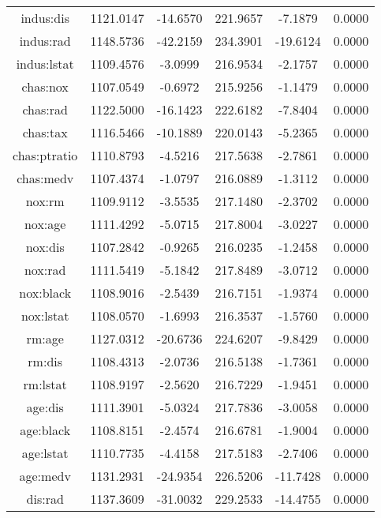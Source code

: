 \begin{longtable}{c|c|c|c|c|c}
     indus:dis & 1121.0147 &  -14.6570 & 221.9657 &   -7.1879 &          0.0000 \\
     indus:rad & 1148.5736 &  -42.2159 & 234.3901 &  -19.6124 &          0.0000 \\
   indus:lstat & 1109.4576 &   -3.0999 & 216.9534 &   -2.1757 &          0.0000 \\
      chas:nox & 1107.0549 &   -0.6972 & 215.9256 &   -1.1479 &          0.0000 \\
      chas:rad & 1122.5000 &  -16.1423 & 222.6182 &   -7.8404 &          0.0000 \\
      chas:tax & 1116.5466 &  -10.1889 & 220.0143 &   -5.2365 &          0.0000 \\
  chas:ptratio & 1110.8793 &   -4.5216 & 217.5638 &   -2.7861 &          0.0000 \\
     chas:medv & 1107.4374 &   -1.0797 & 216.0889 &   -1.3112 &          0.0000 \\
        nox:rm & 1109.9112 &   -3.5535 & 217.1480 &   -2.3702 &          0.0000 \\
       nox:age & 1111.4292 &   -5.0715 & 217.8004 &   -3.0227 &          0.0000 \\
       nox:dis & 1107.2842 &   -0.9265 & 216.0235 &   -1.2458 &          0.0000 \\
       nox:rad & 1111.5419 &   -5.1842 & 217.8489 &   -3.0712 &          0.0000 \\
     nox:black & 1108.9016 &   -2.5439 & 216.7151 &   -1.9374 &          0.0000 \\
     nox:lstat & 1108.0570 &   -1.6993 & 216.3537 &   -1.5760 &          0.0000 \\
        rm:age & 1127.0312 &  -20.6736 & 224.6207 &   -9.8429 &          0.0000 \\
        rm:dis & 1108.4313 &   -2.0736 & 216.5138 &   -1.7361 &          0.0000 \\
      rm:lstat & 1108.9197 &   -2.5620 & 216.7229 &   -1.9451 &          0.0000 \\
       age:dis & 1111.3901 &   -5.0324 & 217.7836 &   -3.0058 &          0.0000 \\
     age:black & 1108.8151 &   -2.4574 & 216.6781 &   -1.9004 &          0.0000 \\
     age:lstat & 1110.7735 &   -4.4158 & 217.5183 &   -2.7406 &          0.0000 \\
      age:medv & 1131.2931 &  -24.9354 & 226.5206 &  -11.7428 &          0.0000 \\
       dis:rad & 1137.3609 &  -31.0032 & 229.2533 &  -14.4755 &          0.0000 \\

\end{longtable}
